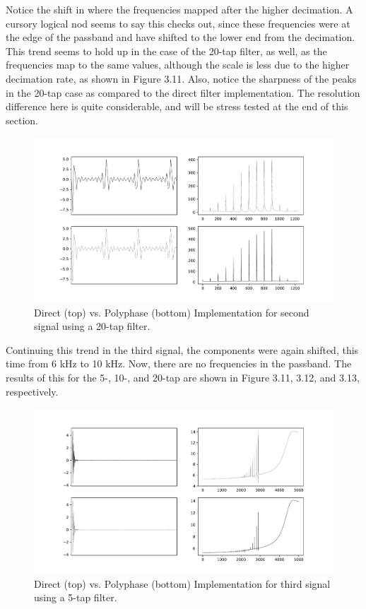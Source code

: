 \documentclass{report}
\begin{document}
Notice the shift in where the frequencies mapped after the higher decimation.  A cursory logical nod seems to say this checks out, since these frequencies were at the edge of the passband and have shifted to the lower end from the decimation.   This trend seems to hold up in the case of the 20-tap filter, as well, as the frequencies map to the same values, although the scale is less due to the higher decimation rate, as shown in Figure 3.11.  Also, notice the sharpness of the peaks in the 20-tap case as compared to the direct filter implementation.  The resolution difference here is quite considerable, and will be stress tested at the end of this section.

\begin{figure}[!ht]
\includegraphics[scale=.45]{Figure_11.pdf}
\caption{Direct (top) vs. Polyphase (bottom) Implementation for second signal using a 20-tap filter.}
\end{figure} 


Continuing this trend in the third signal, the components were again shifted, this time from 6 kHz to 10 kHz. Now, there are no frequencies in the passband. The results of this for the 5-, 10-, and 20-tap are shown in Figure 3.11, 3.12, and 3.13, respectively.

\begin{figure}[!ht]
\includegraphics[scale=.45]{Figure_12.pdf}
\caption{Direct (top) vs. Polyphase (bottom) Implementation for third signal using a 5-tap filter.}
\end{figure} 
\end{document}
